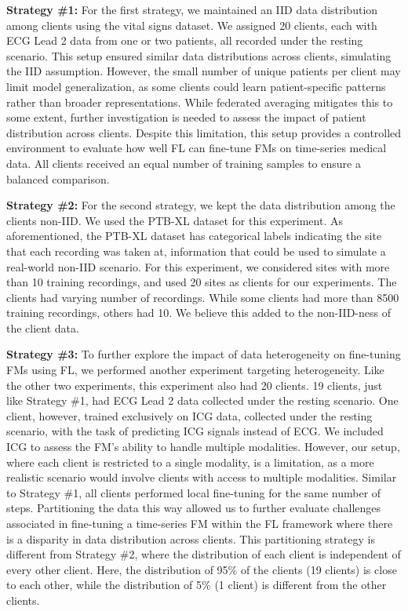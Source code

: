 \textbf{Strategy \#1:} For the first strategy, we maintained an IID data distribution among clients using the vital signs dataset.
We assigned 20 clients, each with ECG Lead 2 data from one or two patients, all recorded under the resting scenario. 
This setup ensured similar data distributions across clients, simulating the IID assumption. 
However, the small number of unique patients per client may limit model generalization, as some clients could learn patient-specific patterns rather than broader representations. 
While federated averaging mitigates this to some extent, further investigation is needed to assess the impact of patient distribution across clients. 
Despite this limitation, this setup provides a controlled environment to evaluate how well FL can fine-tune FMs on time-series medical data. 
All clients received an equal number of training samples to ensure a balanced comparison.

\textbf{Strategy \#2:} For the second strategy, we kept the data distribution among the clients non-IID.
We used the PTB-XL dataset for this experiment.
As aforementioned, the PTB-XL dataset has categorical labels indicating the site that each recording was taken at, information that could be used to simulate a real-world non-IID scenario.
For this experiment, we considered sites with more than 10 training recordings, and used 20 sites as clients for our experiments.
The clients had varying number of recordings. 
While some clients had more than 8500 training recordings, others had 10. 
We believe this added to the non-IID-ness of the client data.

\textbf{Strategy \#3:} To further explore the impact of data heterogeneity on fine-tuning FMs using FL, we performed another experiment targeting heterogeneity. 
Like the other two experiments, this experiment also had 20 clients. 
19 clients, just like Strategy \#1, had ECG Lead 2 data collected under the resting scenario. 
One client, however, trained exclusively on ICG data, collected under the resting scenario, with the task of predicting ICG signals instead of ECG. 
We included ICG to assess the FM’s ability to handle multiple modalities. 
However, our setup, where each client is restricted to a single modality, is a limitation, as a more realistic scenario would involve clients with access to multiple modalities.
Similar to Strategy \#1, all clients performed local fine-tuning for the same number of steps. 
Partitioning the data this way allowed us to further evaluate challenges associated in fine-tuning a time-series FM within the FL framework where there is a disparity in data distribution across clients. 
This partitioning strategy is different from Strategy \#2, where the distribution of each client is independent of every other client. 
Here, the distribution of 95\% of the clients (19 clients) is close to each other, while the distribution of 5\% (1 client) is different from the other clients.

